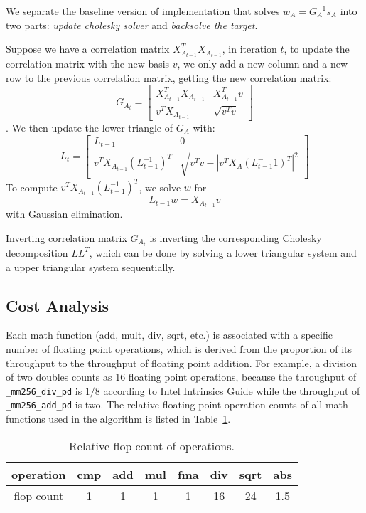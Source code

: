 We separate the baseline version of implementation that solves $w_A = G_A^{-1} s_A$ into two parts: \textit{update cholesky solver} and \textit{backsolve the target}.

Suppose we have a correlation matrix $X_{A_{t-1}}^T X_{A_{t-1}}$, in iteration $t$, to update the correlation matrix with the new basis $v$, we only add a new column and a new row to the previous correlation matrix, getting the new correlation matrix:
\[
G_{A_t} = 
\begin{bmatrix}
X_{A_{t-1}}^T X_{A_{t-1}}   &   X_{A_{t-1}}^T v \\
v^T X_{A_{t-1}}             &   \sqrt{v^T v}
\end{bmatrix}
\].
We then update the lower triangle of $G_A$ with:
\[
L_t = 
\begin{bmatrix}
L_{t-1}   &    0 \\
v^T X_{A_{t-1}} (L_{t-1}^{-1})^T  &  \sqrt{v^T v - |v^T X_A (L_{t-1}^-1)^T | ^2}
\end{bmatrix}
\]
To compute $v^T X_{A_{t-1}} (L_{t-1}^{-1})^T$, we solve $w$ for
$$
L_{t-1} w = X_{A_{t-1}} v
$$ with Gaussian elimination. 

Inverting correlation matrix $G_{A_t}$ is inverting the corresponding Cholesky decomposition $LL^T$, which can be done by solving a lower triangular system and a upper triangular system sequentially. 



\subsection{Cost Analysis}
\label{ssec:cost-analysis}
Each math function (add, mult, div, sqrt, etc.) is associated with a specific number of floating point operations, which is derived from the proportion of its throughput to the throughput of floating point addition. For example, a division of two doubles counts as 16 floating point operations, because the throughput of  \texttt{\_mm256\_div\_pd} is $1/8$ according to Intel Intrinsics Guide \cite{Intrinsics} while the throughput of \texttt{\_mm256\_add\_pd} is two. The relative floating point operation counts of all math functions used in the algorithm is listed in Table~\ref{tab:flop_def}.
 
\begin{table}
\centering
\begin{tabular}{|c||c|c|c|c|c|c|c|}
\hline
operation & cmp & add & mul & fma & div & sqrt & abs \\ \hline
flop count & 1 & 1 & 1 & 1 & 16 & 24 & 1.5 \\ \hline
\end{tabular}
\caption{Relative flop count of operations.}
\label{tab:flop_def}
\end{table}

